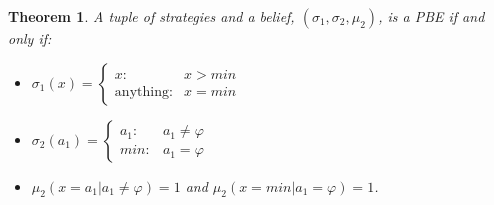 \documentclass[letterpaper]{article} %
\newtheorem{theorem}{Theorem}
\begin{document}
\begin{theorem}
\label{thm:pbe}
A tuple of strategies and a belief, $(\sigma_1, \sigma_2, \mu_2)$, is a PBE if and only if:
\begin{itemize}
    \item $\sigma_1(x)=\begin{cases} x: & x>min \\ \text{anything}: & x=min \end{cases}$
    \item $\sigma_2(a_1)= \begin{cases} a_1: & a_1 \neq \varphi \\ min: & a_1=\varphi \end{cases}$
    \item $\mu_2(x=a_1| a_1\neq \varphi) = 1$ and $\mu_2(x=min| a_1=\varphi)=1$.
\end{itemize}
\end{theorem}
\end{document}
